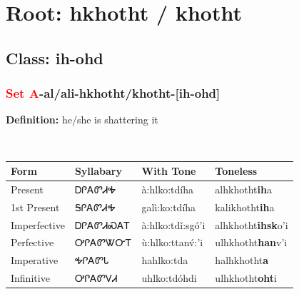\needspace{4in}
\section*{Root: hkhotht / khotht}
\nopagebreak
{}
\needspace{3in}
\subsection*{Class: ih-ohd}
\nopagebreak
\needspace{2in}
\subsubsection*{\textcolor{Red}{Set A}{-}al/ali{-}\textbf{hkhotht/khotht}{-}[ih-ohd]}
\nopagebreak
\textbf{Definition: } he/she is shattering it
\\[0.5em]
\begin{tabularx}{\textwidth}{l X X X}%
\toprule%
\textbf{Form}&\textbf{Syllabary}&\textbf{With Tone}&\textbf{Toneless}\\%
\midrule%
Present&ᎠᎵᎪᏛᏗᎭ&à:hlko:tdíha&alhkhotht\textbf{ih}a\\%
1st Present&ᎦᎵᎪᏛᏗᎭ&galì:ko:tdíha&kalikhotht\textbf{ih}a\\%
Imperfective&ᎠᎵᎪᏛᏗᏍᎪᎢ&à:hlko:tdǐ:sgó’i&alhkhotht\textbf{ihsk}o'i\\%
Perfective&ᎤᎵᎪᏛᏔᏅᎢ&ù:hlko:ttanv́:’i&ulhkhotht\textbf{han}v'i\\%
Imperative&ᎭᎵᎪᏛᏓ&hahlko:tda&halhkhotht\textbf{a}\\%
Infinitive&ᎤᎵᎪᏛᏙᏗ&uhlko:tdóhdi&ulhkhotht\textbf{oht}i\\%
\bottomrule%
\end{tabularx}
\\[1em]